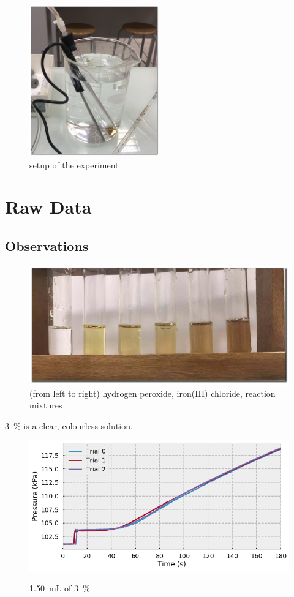 \documentclass[a4paper, 12pt]{article}
\begin{document}
\begin{figure}[hbt]
    \centering
    \includegraphics[width=0.5\textwidth]{imgs/setup}
    \caption{setup of the experiment}
    \label{fig:setup}
\end{figure}


\section{Raw Data}
\subsection{Observations}
\begin{figure}[htb]
    \centering
    \includegraphics[width=\textwidth]{imgs/colours}
    \caption{(from left to right) hydrogen peroxide, iron(III) chloride, reaction mixtures}
    \label{fig:colours}
\end{figure}

\SI{3}{\percent}  is a clear, colourless solution. 

\begin{figure}[hbt]
    \centering
    \caption{\SI{1.50}{\mL} of \SI{3}{\percent} }
    \includegraphics[width=\textwidth]{imgs/pressure}
    \label{fig:pressure}
\end{figure}
\end{document}
